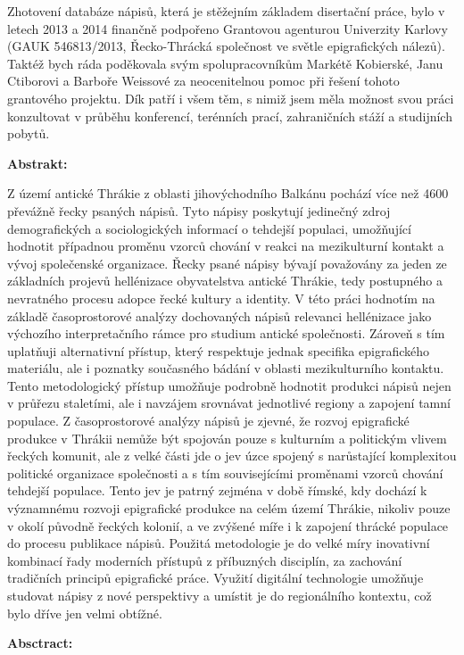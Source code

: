 Zhotovení databáze nápisů, která je stěžejním základem disertační práce, bylo v letech 2013 a 2014 finančně podpořeno Grantovou agenturou Univerzity Karlovy (GAUK 546813/2013, Řecko-Thrácká společnost ve světle epigrafických nálezů). Taktéž bych ráda poděkovala svým spolupracovníkům Markétě Kobierské, Janu Ctiborovi a Barboře Weissové za neocenitelnou pomoc při řešení tohoto grantového projektu. Dík patří i všem těm, s nimiž jsem měla možnost svou práci konzultovat v průběhu konferencí, terénních prací, zahraničních stáží a studijních pobytů.

{\bf Abstrakt:}

Z území antické Thrákie z oblasti jihovýchodního Balkánu pochází více než 4600 převážně řecky psaných nápisů. Tyto nápisy poskytují jedinečný zdroj demografických a sociologických informací o tehdejší populaci, umožňující hodnotit případnou proměnu vzorců chování v reakci na mezikulturní kontakt a vývoj společenské organizace. Řecky psané nápisy bývají považovány za jeden ze základních projevů hellénizace obyvatelstva antické Thrákie, tedy postupného a nevratného procesu adopce řecké kultury a identity. V této práci hodnotím na základě časoprostorové analýzy dochovaných nápisů relevanci hellénizace jako výchozího interpretačního rámce pro studium antické společnosti. Zároveň s tím uplatňuji alternativní přístup, který respektuje jednak specifika epigrafického materiálu, ale i poznatky současného bádání v oblasti mezikulturního kontaktu. Tento metodologický přístup umožňuje podrobně hodnotit produkci nápisů nejen v průřezu staletími, ale i navzájem srovnávat jednotlivé regiony a zapojení tamní populace. Z časoprostorové analýzy nápisů je zjevné, že rozvoj epigrafické produkce v Thrákii nemůže být spojován pouze s kulturním a politickým vlivem řeckých komunit, ale z velké části jde o jev úzce spojený s narůstající komplexitou politické organizace společnosti a s tím souvisejícími proměnami vzorců chování tehdejší populace. Tento jev je patrný zejména v době římské, kdy dochází k významnému rozvoji epigrafické produkce na celém území Thrákie, nikoliv pouze v okolí původně řeckých kolonií, a ve zvýšené míře i k zapojení thrácké populace do procesu publikace nápisů. Použitá metodologie je do velké míry inovativní kombinací řady moderních přístupů z příbuzných disciplín, za zachování tradičních principů epigrafické práce. Využití digitální technologie umožňuje studovat nápisy z nové perspektivy a umístit je do regionálního kontextu, což bylo dříve jen velmi obtížné.

{\bf Absctract:}


